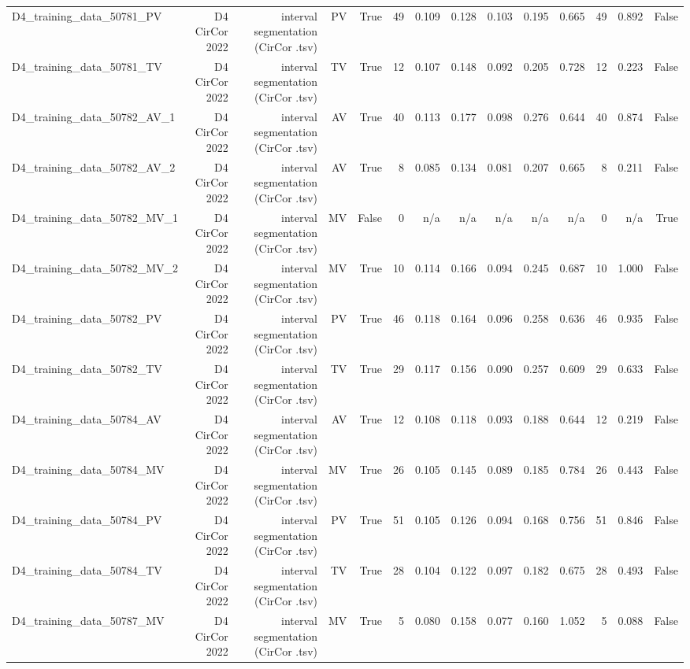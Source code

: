 \begin{table}[htbp]
\begin{tabular}{lrrrrrrrrrrrrr}
    D4\_training\_data\_50781\_PV & D4 CirCor 2022 & interval segmentation (CirCor .tsv) & PV & True & 49 & 0.109 & 0.128 & 0.103 & 0.195 & 0.665 & 49 & 0.892 & False \\
    D4\_training\_data\_50781\_TV & D4 CirCor 2022 & interval segmentation (CirCor .tsv) & TV & True & 12 & 0.107 & 0.148 & 0.092 & 0.205 & 0.728 & 12 & 0.223 & False \\
    D4\_training\_data\_50782\_AV\_1 & D4 CirCor 2022 & interval segmentation (CirCor .tsv) & AV & True & 40 & 0.113 & 0.177 & 0.098 & 0.276 & 0.644 & 40 & 0.874 & False \\
    D4\_training\_data\_50782\_AV\_2 & D4 CirCor 2022 & interval segmentation (CirCor .tsv) & AV & True & 8 & 0.085 & 0.134 & 0.081 & 0.207 & 0.665 & 8 & 0.211 & False \\
    D4\_training\_data\_50782\_MV\_1 & D4 CirCor 2022 & interval segmentation (CirCor .tsv) & MV & False & 0 & n/a & n/a & n/a & n/a & n/a & 0 & n/a & True \\
    D4\_training\_data\_50782\_MV\_2 & D4 CirCor 2022 & interval segmentation (CirCor .tsv) & MV & True & 10 & 0.114 & 0.166 & 0.094 & 0.245 & 0.687 & 10 & 1.000 & False \\
    D4\_training\_data\_50782\_PV & D4 CirCor 2022 & interval segmentation (CirCor .tsv) & PV & True & 46 & 0.118 & 0.164 & 0.096 & 0.258 & 0.636 & 46 & 0.935 & False \\
    D4\_training\_data\_50782\_TV & D4 CirCor 2022 & interval segmentation (CirCor .tsv) & TV & True & 29 & 0.117 & 0.156 & 0.090 & 0.257 & 0.609 & 29 & 0.633 & False \\
    D4\_training\_data\_50784\_AV & D4 CirCor 2022 & interval segmentation (CirCor .tsv) & AV & True & 12 & 0.108 & 0.118 & 0.093 & 0.188 & 0.644 & 12 & 0.219 & False \\
    D4\_training\_data\_50784\_MV & D4 CirCor 2022 & interval segmentation (CirCor .tsv) & MV & True & 26 & 0.105 & 0.145 & 0.089 & 0.185 & 0.784 & 26 & 0.443 & False \\
    D4\_training\_data\_50784\_PV & D4 CirCor 2022 & interval segmentation (CirCor .tsv) & PV & True & 51 & 0.105 & 0.126 & 0.094 & 0.168 & 0.756 & 51 & 0.846 & False \\
    D4\_training\_data\_50784\_TV & D4 CirCor 2022 & interval segmentation (CirCor .tsv) & TV & True & 28 & 0.104 & 0.122 & 0.097 & 0.182 & 0.675 & 28 & 0.493 & False \\
    D4\_training\_data\_50787\_MV & D4 CirCor 2022 & interval segmentation (CirCor .tsv) & MV & True & 5 & 0.080 & 0.158 & 0.077 & 0.160 & 1.052 & 5 & 0.088 & False \\

\end{tabular}
\end{table}
